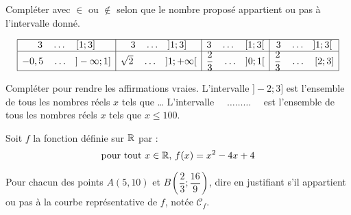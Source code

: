 \documentclass[a4paper,11pt,DIV15,BCOR0mm]{scrartcl}
\begin{document}
\begin{exercice}
Compléter  avec $\in$ ou $\notin$ selon que le nombre proposé
appartient ou pas à l'intervalle donné.

\renewcommand{\arraystretch}{3}
\[
\begin{array}{|c|c|c|c|}
\hline
3 \quad \dots \quad [1;3] & 3 \quad \dots \quad ]1;3] &
3 \quad \dots \quad [1;3[ & 3 \quad \dots \quad ]1;3[ \\\hline
-0,5 \quad \dots \quad ]-\infty;1] & \sqrt{2} \quad \dots \quad ]1;+\infty[ &
\dfrac{2}{3} \quad \dots \quad ]0;1[ & \dfrac{2}{3} \quad \dots \quad [2;3] \\\hline
\end{array}
\]
\vfill
\end{exercice}

\begin{exercice}
Compléter pour rendre les affirmations vraies.
\vfill
L'intervalle $]-2;3]$ est l'ensemble de tous les nombres réels $x$ tels que \dots
\vfill
L'intervalle $\quad\dots\dots\dots\quad$ est l'ensemble de tous les nombres réels $x$ tels
que $x\leqslant 100$.
\vfill
\end{exercice}

\begin{exercice}
Soit $f$ la fonction définie sur $\mathbb{R}$ par :
\[
\text{pour tout $x\in\mathbb{R}$, }f(x) = x^2-4x+4
\]

Pour chacun des points $A(5,10)$ et $B(\dfrac{2}{3};\dfrac{16}{9})$,
dire en justifiant s'il appartient ou pas à la courbe représentative de $f$, notée $\mathcal{C}_f$.
\vfill
\vfill
\vfill
\vfill
\vfill
\vfill
\vfill
\vfill
\vfill
\end{exercice}
\end{document}
